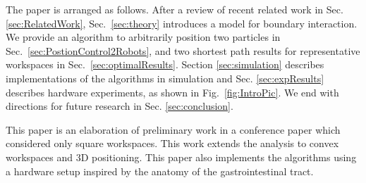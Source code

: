 The paper is arranged as follows. 
After a review of recent related work in Sec.  \ref{sec:RelatedWork},
  Sec.~\ref{sec:theory} introduces a  model for boundary interaction.   
We provide an algorithm to arbitrarily position two particles in Sec.~\ref{sec:PostionControl2Robots},  and two shortest path results for representative workspaces in Sec.~\ref{sec:optimalResults}.
 Section  \ref{sec:simulation} describes implementations of the algorithms in simulation and  Sec.  \ref{sec:expResults} describes hardware experiments, as shown in Fig.~\ref{fig:IntroPic}. 
 We end with directions for future research in Sec.  \ref{sec:conclusion}.

This paper is an elaboration of preliminary work in a conference paper \cite{shahrokhi2017algorithms} which considered only square workspaces. This work extends the analysis to convex workspaces and 3D positioning. This paper also implements the algorithms  using a hardware setup inspired by the anatomy of the gastrointestinal tract.



